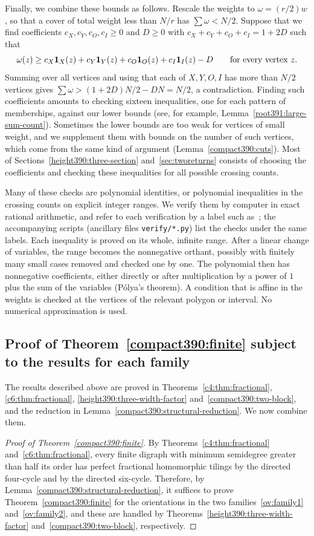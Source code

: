Finally, we combine these bounds as follows. Rescale the weights to $\omega=(r/2)w$, so that a cover of total weight less than $N/r$ has $\sum\omega<N/2$. Suppose that we find coefficients $c_X,c_Y,c_O,c_I\geq 0$ and $D\geq 0$ with $c_X+c_Y+c_O+c_I=1+2D$ such that
\[
 \omega(z)\geq c_X\mathbf 1_X(z)+c_Y\mathbf 1_Y(z)+c_O\mathbf 1_O(z)+c_I\mathbf 1_I(z)-D\qquad\text{for every vertex }z.
\]
Summing over all vertices and using that each of $X,Y,O,I$ has more than $N/2$ vertices gives $\sum\omega>(1+2D)N/2-DN=N/2$, a contradiction. Finding such coefficients amounts to checking sixteen inequalities, one for each pattern of memberships, against our lower bounds (see, for example, Lemma~\ref{root391:large-sum-count}).
Sometimes the lower bounds are too weak for vertices of small weight, and we supplement them with bounds on the number of such vertices, which come from the same kind of argument (Lemma~\ref{compact390:cuts}).
Most of Sections~\ref{height390:three-section} and~\ref{sec:tworeturns} consists of choosing the coefficients and checking these inequalities for all possible crossing counts.

Many of these checks are polynomial identities, or polynomial inequalities in the crossing counts on explicit integer ranges. We verify them by computer in exact rational arithmetic, and refer to each verification by a label such as~; the accompanying scripts (ancillary files \texttt{verify/*.py}) list the checks under the same labels. Each inequality is proved on its whole, infinite range. After a linear change of variables, the range becomes the nonnegative orthant, possibly with finitely many small cases removed and checked one by one. The polynomial then has nonnegative coefficients, either directly or after multiplication by a power of $1$ plus the sum of the variables (P\'olya's theorem). A condition that is affine in the weights is checked at the vertices of the relevant polygon or interval. No numerical approximation is used.

\subsection{Proof of Theorem~\ref{compact390:finite} subject to the results for each family}\label{sec:assembly}
The results described above are proved in Theorems~\ref{c4:thm:fractional}, \ref{c6:thm:fractional}, \ref{height390:three-width-factor} and~\ref{compact390:two-block}, and the reduction in Lemma~\ref{compact390:structural-reduction}. We now combine them.

\begin{proof}[Proof of Theorem~\ref{compact390:finite}]
By Theorems~\ref{c4:thm:fractional} and~\ref{c6:thm:fractional}, every finite digraph with minimum semidegree greater than half its order has perfect fractional homomorphic tilings by the directed four-cycle and by the directed six-cycle.
Therefore, by Lemma~\ref{compact390:structural-reduction}, it suffices to prove Theorem~\ref{compact390:finite} for the orientations in the two families~\ref{ov:family1} and~\ref{ov:family2}, and these are handled by
Theorems~\ref{height390:three-width-factor} and~\ref{compact390:two-block}, respectively.
\end{proof}
